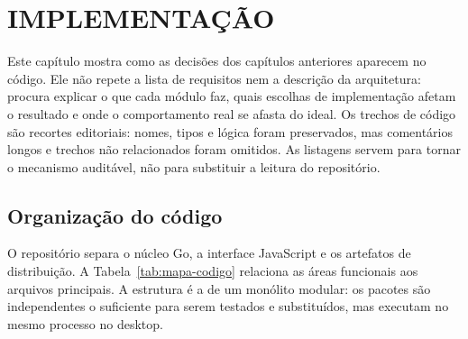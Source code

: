 
\chapter{IMPLEMENTAÇÃO}
\label{cap:implementacao}

Este capítulo mostra como as decisões dos capítulos anteriores aparecem no
código. Ele não repete a lista de requisitos nem a descrição da arquitetura:
procura explicar o que cada módulo faz, quais escolhas de implementação afetam
o resultado e onde o comportamento real se afasta do ideal. Os trechos de código
são recortes editoriais: nomes, tipos e lógica foram preservados, mas comentários
longos e trechos não relacionados foram omitidos. As listagens servem para
tornar o mecanismo auditável, não para substituir a leitura do repositório.

\section{Organização do código}
\label{sec:organizacao-codigo}

O repositório separa o núcleo Go, a interface JavaScript e os artefatos de
distribuição. A Tabela~\ref{tab:mapa-codigo} relaciona as áreas funcionais aos
arquivos principais. A estrutura é a de um monólito modular: os pacotes são
independentes o suficiente para serem testados e substituídos, mas executam no
mesmo processo no desktop.

